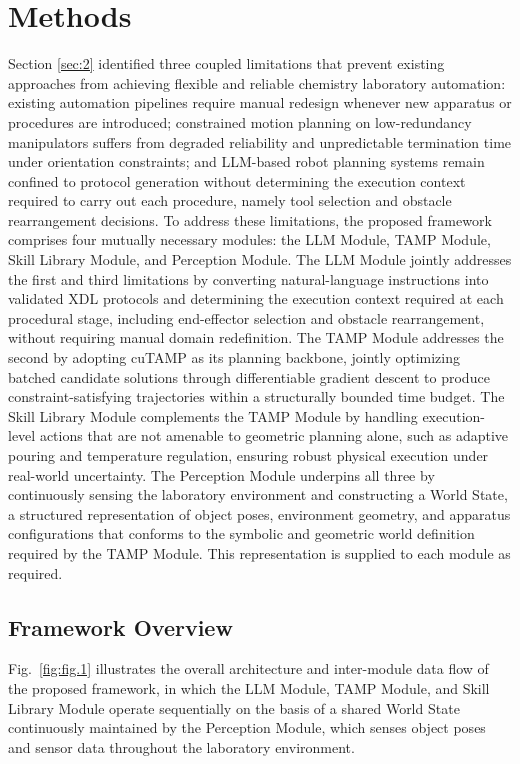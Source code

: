 \documentclass{ieeeaccess}
\begin{document}
\section{Methods}\label{sec:3}
Section \ref{sec:2} identified three coupled limitations that prevent existing approaches from achieving flexible and reliable chemistry laboratory automation: existing automation pipelines require manual redesign whenever new apparatus or procedures are introduced; constrained motion planning on low-redundancy manipulators suffers from degraded reliability and unpredictable termination time under orientation constraints; and LLM-based robot planning systems remain confined to protocol generation without determining the execution context required to carry out each procedure, namely tool selection and obstacle rearrangement decisions.
To address these limitations, the proposed framework comprises four mutually necessary modules: the LLM Module, TAMP Module, Skill Library Module, and Perception Module. The LLM Module jointly addresses the first and third limitations by converting natural-language instructions into validated XDL protocols and determining the execution context required at each procedural stage, including end-effector selection and obstacle rearrangement, without requiring manual domain redefinition. The TAMP Module addresses the second by adopting cuTAMP \cite{shen2025differentiable} as its planning backbone, jointly optimizing batched candidate solutions through differentiable gradient descent to produce constraint-satisfying trajectories within a structurally bounded time budget. The Skill Library Module complements the TAMP Module by handling execution-level actions that are not amenable to geometric planning alone, such as adaptive pouring and temperature regulation, ensuring robust physical execution under real-world uncertainty. The Perception Module underpins all three by continuously sensing the laboratory environment and constructing a World State, a structured representation of object poses, environment geometry, and apparatus configurations that conforms to the symbolic and geometric world definition required by the TAMP Module. This representation is supplied to each module as required.

\subsection{Framework Overview}\label{sec:3.1}



Fig.~\ref{fig:fig.1} illustrates the overall architecture and inter-module data flow of the proposed framework, in which the LLM Module, TAMP Module, and Skill Library Module operate sequentially on the basis of a shared World State continuously maintained by the Perception Module, which senses object poses and sensor data throughout the laboratory environment.
\end{document}

